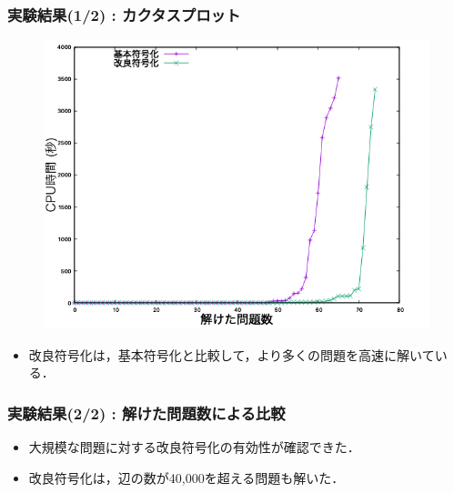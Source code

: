 \documentclass[dvipdfmx,11pt]{beamer}
\begin{document}
\begin{frame}\frametitle{実験結果(1/2) : カクタスプロット}
 \begin{figure}[h]
  \centering
  \includegraphics[scale=0.38]{fig/cactus.png}
 \end{figure}

\begin{itemize}
 \item 改良符号化は，基本符号化と比較して，より多くの問題を高速に解いている．
\end{itemize}
\end{frame}

\begin{frame}\frametitle{実験結果(2/2) : 解けた問題数による比較}

\begin{table}[t]
 \centering
 
\end{table}

\begin{itemize}
 \item 大規模な問題に対する改良符号化の有効性が確認できた．
 \item 改良符号化は，辺の数が40,000を超える問題も解いた．
\end{itemize}

\end{frame}
\end{document}
